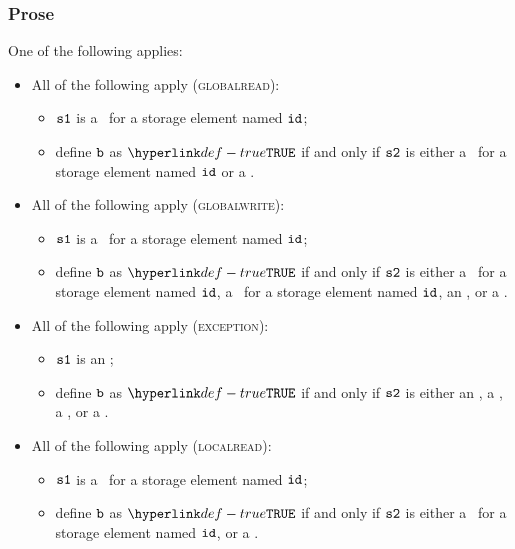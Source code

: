 \subsubsection{Prose}
One of the following applies:
\begin{itemize}
    \item All of the following apply (\textsc{globalread}):
    \begin{itemize}
        \item $\texttt{s1}$ is a \ReadGlobalTerm\ for a storage element named $\texttt{id}$;
        \item define $\texttt{b}$ as $\True$ if and only if $\texttt{s2}$ is either
              a \WriteGlobalTerm\ for a storage element named $\texttt{id}$ or a \RecursiveCallTerm.
    \end{itemize}

    \item All of the following apply (\textsc{globalwrite}):
    \begin{itemize}
        \item $\texttt{s1}$ is a \WriteGlobalTerm\ for a storage element named $\texttt{id}$;
        \item define $\texttt{b}$ as $\True$ if and only if $\texttt{s2}$ is either
              a \WriteGlobalTerm\ for a storage element named $\texttt{id}$,
              a \ReadGlobalTerm\ for a storage element named $\texttt{id}$,
              an \ThrowExceptionTerm, or
              a \RecursiveCallTerm.
    \end{itemize}

    \item All of the following apply (\textsc{exception}):
    \begin{itemize}
        \item $\texttt{s1}$ is an \ThrowExceptionTerm;
        \item define $\texttt{b}$ as $\True$ if and only if $\texttt{s2}$ is either
                an \ThrowExceptionTerm,
                a \WriteLocalTerm,
                a \PerformsAssertionsTerm, or a
                \RecursiveCallTerm.
    \end{itemize}

    \item All of the following apply (\textsc{localread}):
    \begin{itemize}
        \item $\texttt{s1}$ is a \ReadLocalTerm\ for a storage element named $\texttt{id}$;
        \item define $\texttt{b}$ as $\True$ if and only if $\texttt{s2}$ is either
                a \WriteLocalTerm\ for a storage element named $\texttt{id}$, or a
                \RecursiveCallTerm.
    \end{itemize}


\end{itemize}
